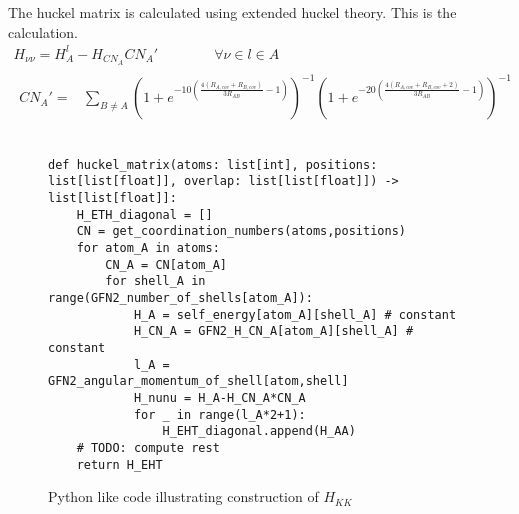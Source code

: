 The huckel matrix is calculated using extended huckel theory. This is the calculation.
\begin{gather}
    H_{\nu\nu} = H_A^l - H_{CN_A}CN_A' \quad\quad\quad\quad\forall \nu \in l \in A\\
    \begin{split}
        CN_A' = &\sum_{B\neq A}\left(1+e^{-10\left(\frac{4\left(R_{A,cov}+R_{B,cov}\right)}{3R_{AB}}-1\right)}\right)^{-1}\left(1+e^{-20\left(\frac{4\left(R_{A,cov}+R_{B,cov}+2\right)}{3R_{AB}}-1\right)}\right)^{-1}
    \end{split}
\end{gather}
\begin{figure}[H]
\begin{verbatim}

def huckel_matrix(atoms: list[int], positions: list[list[float]], overlap: list[list[float]]) -> list[list[float]]:
    H_ETH_diagonal = []
    CN = get_coordination_numbers(atoms,positions)
    for atom_A in atoms:
        CN_A = CN[atom_A]
        for shell_A in range(GFN2_number_of_shells[atom_A]):
            H_A = self_energy[atom_A][shell_A] # constant
            H_CN_A = GFN2_H_CN_A[atom_A][shell_A] # constant
            l_A = GFN2_angular_momentum_of_shell[atom,shell] 
            H_nunu = H_A-H_CN_A*CN_A
            for _ in range(l_A*2+1):
                H_EHT_diagonal.append(H_AA)
    # TODO: compute rest
    return H_EHT
\end{verbatim}
\caption{Python like code illustrating construction of $H_{KK}$}
\end{figure}


